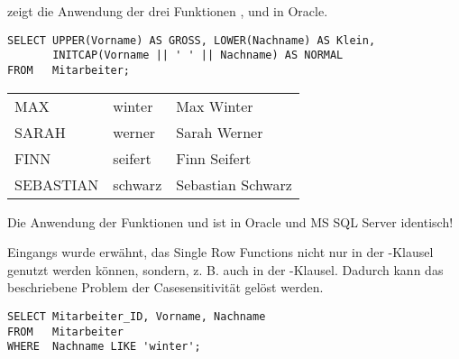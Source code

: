  zeigt die Anwendung der drei Funktionen ,  und  in Oracle.
\begin{lstlisting}[language=oracle_sql,caption={UPPER, LOWER und INITCAP},label=sql03_01]
SELECT UPPER(Vorname) AS GROSS, LOWER(Nachname) AS Klein,
       INITCAP(Vorname || ' ' || Nachname) AS NORMAL
FROM   Mitarbeiter;
        \end{lstlisting}
\begin{center}
    \begin{small}
        \tablehead{}
        \tabletail {
        }
        \begin{oraclesql}
            \begin{supertabular}{lll}
                MAX & winter & Max Winter \\
                SARAH & werner & Sarah Werner \\
                FINN & seifert & Finn Seifert \\
                SEBASTIAN & schwarz & Sebastian Schwarz \\
            \end{supertabular}
        \end{oraclesql}
    \end{small}
\end{center}
\begin{merke}
    Die Anwendung der Funktionen  und  ist in Oracle und MS SQL Server identisch!
\end{merke}
Eingangs wurde erwähnt, das Single Row Functions nicht nur in der \SELECT-Klausel genutzt werden können, sondern, z. B. auch in der \WHERE-Klausel. Dadurch kann das beschriebene Problem der Casesensitivität gelöst werden.
\begin{lstlisting}[language=oracle_sql,caption={Das Problem der Casesensitivität},label=sql03_02]
SELECT Mitarbeiter_ID, Vorname, Nachname
FROM   Mitarbeiter
WHERE  Nachname LIKE 'winter';
        \end{lstlisting}

